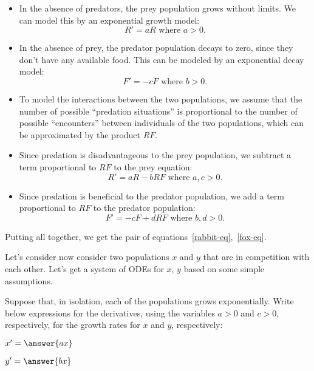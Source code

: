 \documentclass{ximera}
\begin{document}
\begin{itemize}
\item In the absence of predators, the prey population grows without limits. We can model this by an exponential growth model:
\[
R'=aR\text{ where $a>0$}.
\]
\item In the absence of prey, the predator population decays to zero, since they don't have any available food. This can be modeled by an exponential decay model:
\[
F'=-cF\text{ where $b>0$.}
\]
\item To model the interactions between the two populations, we assume that the number of possible ``predation situations'' is proportional to the number of possible ``encounters'' between individuals of the two populations, which can be approximated by the product $RF$.
\item Since predation is disadvantageous to the prey population, we subtract a term proportional to $RF$ to the prey equation:
\[
R'=aR-bRF\text{ where $a,c>0$}.
\]
\item Since predation is beneficial to the predator population, we add a term proportional to $RF$ to the predator population:
\[
F'=-cF+dRF\text{ where $b,d>0$.}
\]
\end{itemize}
Putting all together, we get the pair of equations~\ref{rabbit-eq},~\ref{fox-eq}.

\begin{problem}

Let's consider now consider two populations $x$ and $y$ that are in competition with each other. Let's get a system of ODEs for $x$, $y$ based on some simple assumptions.

Suppose that, in isolation, each of the populations grows exponentially. Write below expressions for the derivatives, using the variables $a>0$ and $c>0$, respectively, for the growth rates for $x$ and $y$, respectively:

\begin{question}
$x'= \answer{ax}$
\end{question}
\begin{question}
$y'= \answer{bx}$
\end{question}
\end{problem}
\end{document}
